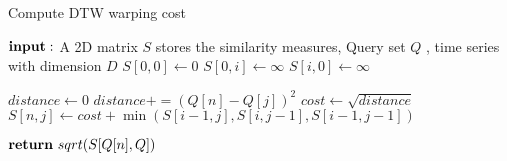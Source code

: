 \documentclass{article}
\begin{document}
	\begin{algorithm}
		\caption{Compute DTW warping cost }
		\begin{algorithmic}[0]
		\end{algorithmic}
		\begin{algorithmic}[1]
			\State ${\bf input:\ }${A 2D matrix $S$ stores the similarity  measures, Query set $Q$ , time series with dimension $D$}
			\State $S[0,0] \gets 0$
				\State $S[0,i] \gets \infty$
			\EndFor
			\State $S[i,0] \gets \infty$
			\EndFor	

				\State $distance \gets 0$
					\State $distance += {(Q[n]-Q[j])}^2 $
				\EndFor
			\State $cost \gets \sqrt{distance} $
			\State $S[n, j] \gets cost + \min (S[i-1, j], S[i, j-1], S[i-1, j-1])$
			\EndFor
			
			
			\State ${\bf return\ }sqrt(S[Q[n], Q])$
			\EndProcedure
		\end{algorithmic}
	\end{algorithm}
\end{document}
